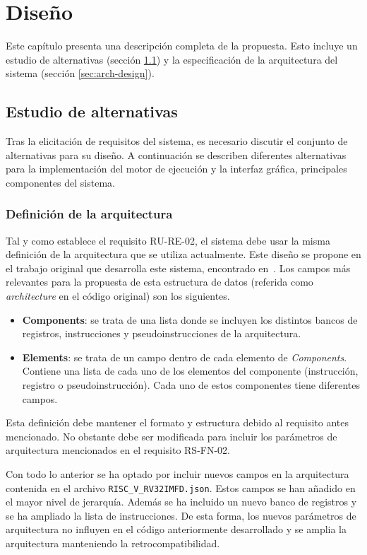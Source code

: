 \chapter{Diseño}\label{chap:design}

Este capítulo presenta una descripción completa de la propuesta. Esto incluye
un estudio de alternativas (sección \ref{alternativas}) y la especificación de
la arquitectura del sistema (sección \ref{sec:arch-design}).

\section{Estudio de alternativas}\label{alternativas}
Tras la elicitación de requisitos del sistema, es necesario discutir el conjunto de alternativas para su diseño. A continuación se describen diferentes alternativas para la implementación del motor de ejecución y la interfaz gráfica, principales componentes del sistema.

\subsection{Definición de la arquitectura}\label{subsec:defi-arch}
Tal y como establece el requisito RU-RE-02, el sistema debe usar la misma definición de la arquitectura que se utiliza actualmente. Este diseño se propone en el trabajo original que desarrolla este sistema, encontrado en~\cite{camarmasCREATOR}. Los campos más relevantes para la propuesta de esta estructura de datos (referida como \textit{architecture} en el código original) son los siguientes. 

\begin{itemize}
\item \textbf{Components}: se trata de una lista donde se incluyen los distintos bancos de registros, instrucciones y pseudoinstrucciones de la arquitectura.
\item \textbf{Elements}: se trata de un campo dentro de cada elemento de \textit{Components}. Contiene una lista de cada uno de los elementos del componente (instrucción, registro o pseudoinstrucción). Cada uno de estos componentes tiene diferentes campos.
\end{itemize}

Esta definición debe mantener el formato y estructura debido al requisito antes mencionado. No obstante debe ser modificada para incluir los parámetros de arquitectura mencionados en el requisito RS-FN-02.

Con todo lo anterior se ha optado por incluir nuevos campos en la arquitectura contenida en el archivo \texttt{RISC\_V\_RV32IMFD.json}. Estos campos se han añadido en el mayor nivel de jerarquía. Además se ha incluido un nuevo banco de registros y se ha ampliado la lista de instrucciones. De esta forma, los nuevos parámetros de arquitectura no influyen en el código anteriormente desarrollado y se amplia la arquitectura manteniendo la retrocompatibilidad.

